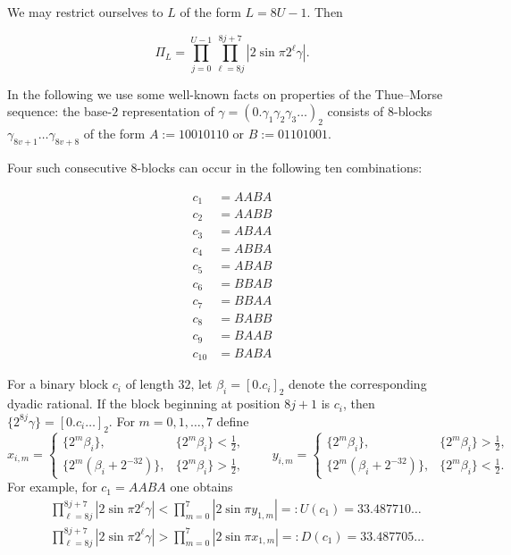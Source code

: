 \documentclass[10pt]{article}
\newcommand{\1}{\mathbf{1}}
\begin{document}
We may restrict ourselves to $L$ of the form $L=8 U-1$. Then

$$
\Pi_{L}=\prod_{j=0}^{U-1} \prod_{\ell=8 j}^{8 j+7}\left|2 \sin \pi 2^{\ell} \gamma\right| .
$$

In the following we use some well-known facts on properties of the Thue--Morse sequence: the base-$2$ representation of $\gamma=(0.\gamma_1\gamma_2\gamma_3\ldots)_2$ consists of 8-blocks $\gamma_{8 v+1} \ldots \gamma_{8 v+8}$ of the form $A:=10010110$ or $B:=01101001$.

Four such consecutive 8-blocks can occur in the following ten combinations:

$$
\begin{aligned}
c_{1} & =A A B A \\
c_{2} & =A A B B \\
c_{3} & =A B A A \\
c_{4} & =A B B A \\
c_{5} & =A B A B \\
c_{6} & =B B A B \\
c_{7} & =B B A A \\
c_{8} & =B A B B \\
c_{9} & =B A A B \\
c_{10} & =B A B A
\end{aligned}
$$

For a binary block $c_i$ of length $32$, let $\beta_i=[0.c_i]_2$ denote the
corresponding dyadic rational.  If the block beginning at position $8j+1$ is
$c_i$, then $\{2^{8j}\gamma\}=[0.c_i\ldots]_2$.  For $m=0,1,\ldots,7$ define
\[
x_{i,m}=\begin{cases}
\{2^m\beta_i\},&\{2^m\beta_i\}<\tfrac12,\\
\{2^m(\beta_i+2^{-32})\},&\{2^m\beta_i\}>\tfrac12,
\end{cases}
\qquad
y_{i,m}=\begin{cases}
\{2^m\beta_i\},&\{2^m\beta_i\}>\tfrac12,\\
\{2^m(\beta_i+2^{-32})\},&\{2^m\beta_i\}<\tfrac12.
\end{cases}
\]
For example, for $c_1=AABA$ one obtains
\begin{align*}
&\prod_{\ell=8j}^{8j+7}\left|2 \sin \pi 2^{\ell} \gamma\right|<\prod_{m=0}^{7}\left|2 \sin \pi y_{1, m}\right|=: U\left(c_{1}\right)=33.487710 \ldots \\
& \prod_{\ell=8 j}^{8 j+7}\left|2 \sin \pi 2^{\ell} \gamma\right|>\prod_{m=0}^{7}\left|2 \sin \pi x_{1, m}\right|=: D\left(c_{1}\right)=33.487705 \ldots
\end{align*}
\end{document}
